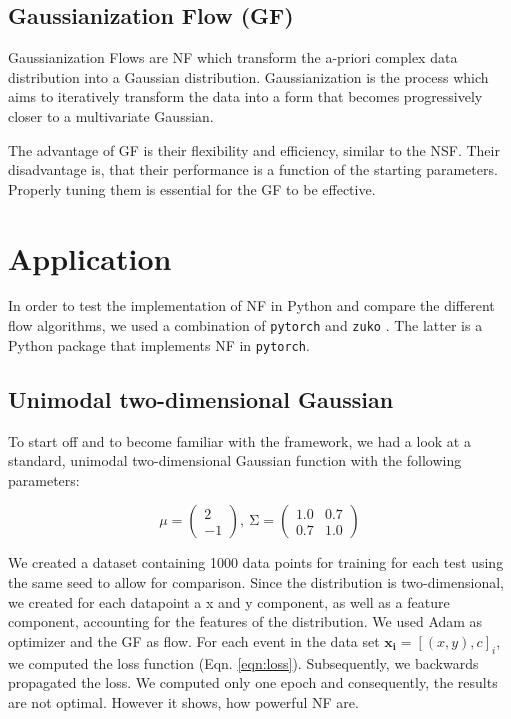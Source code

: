 \documentclass[
nofootinbib,
 amsmath,amssymb,
 aps,
]{revtex4-2}
\def\code#1{\texttt{#1}}
\begin{document}
\subsection{Gaussianization Flow (GF)}
Gaussianization Flows are NF which transform the a-priori complex data distribution into a Gaussian distribution. Gaussianization is the process which aims to iteratively transform the data into a form that becomes progressively closer to a multivariate Gaussian.

The advantage of GF is their flexibility and efficiency, similar to the NSF. Their disadvantage is, that their performance is a function of the starting parameters. Properly tuning them is essential for the GF to be effective.

\section{Application}
In order to test the implementation of NF in Python and compare the different flow algorithms, we used a combination of \code{pytorch} \cite{PyTorch} and \code{zuko} \cite{zuko}. The latter is a Python package that implements NF in \code{pytorch}.

\subsection{Unimodal two-dimensional Gaussian}
To start off and to become familiar with the framework, we had a look at a standard, unimodal two-dimensional Gaussian function with the following parameters:

\begin{equation}
    \mu = \begin{pmatrix} 2 \\ -1 \end{pmatrix},\ \mathrm{\Sigma} = \begin{pmatrix} 1.0 & 0.7 \\ 0.7 & 1.0 \end{pmatrix}
\label{eqn:unimod}
\end{equation}

We created a dataset containing 1000 data points for training for each test using the same seed to allow for comparison. Since the distribution is two-dimensional, we created for each datapoint a x and y component, as well as a feature component, accounting for the features of the distribution. We used Adam as optimizer and the GF as flow. For each event in the data set $\boldsymbol{x_i} = [(x, y), c]_i$, we computed the loss function (Eqn. \ref{eqn:loss}). Subsequently, we backwards propagated the loss. We computed only one epoch and consequently, the results are not optimal. However it shows, how powerful NF are. \\
\end{document}
